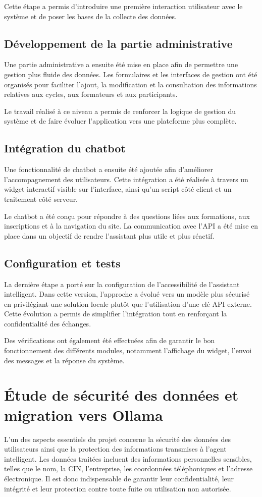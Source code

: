 \documentclass[11pt,a4paper]{report}
\begin{document}
Cette étape a permis d’introduire une première interaction utilisateur avec le système et de poser les bases de la collecte des données.

\section{Développement de la partie administrative}
Une partie administrative a ensuite été mise en place afin de permettre une gestion plus fluide des données. Les formulaires et les interfaces de gestion ont été organisés pour faciliter l’ajout, la modification et la consultation des informations relatives aux cycles, aux formateurs et aux participants.

Le travail réalisé à ce niveau a permis de renforcer la logique de gestion du système et de faire évoluer l’application vers une plateforme plus complète.

\section{Intégration du chatbot}
Une fonctionnalité de chatbot a ensuite été ajoutée afin d’améliorer l’accompagnement des utilisateurs. Cette intégration a été réalisée à travers un widget interactif visible sur l’interface, ainsi qu’un script côté client et un traitement côté serveur.

Le chatbot a été conçu pour répondre à des questions liées aux formations, aux inscriptions et à la navigation du site. La communication avec l’API a été mise en place dans un objectif de rendre l’assistant plus utile et plus réactif.

\section{Configuration et tests}
La dernière étape a porté sur la configuration de l’accessibilité de l’assistant intelligent. Dans cette version, l’approche a évolué vers un modèle plus sécurisé en privilégiant une solution locale plutôt que l’utilisation d’une clé API externe. Cette évolution a permis de simplifier l’intégration tout en renforçant la confidentialité des échanges.

Des vérifications ont également été effectuées afin de garantir le bon fonctionnement des différents modules, notamment l’affichage du widget, l’envoi des messages et la réponse du système.

\chapter{Étude de sécurité des données et migration vers Ollama}
L’un des aspects essentiels du projet concerne la sécurité des données des utilisateurs ainsi que la protection des informations transmises à l’agent intelligent. Les données traitées incluent des informations personnelles sensibles, telles que le nom, la CIN, l’entreprise, les coordonnées téléphoniques et l’adresse électronique. Il est donc indispensable de garantir leur confidentialité, leur intégrité et leur protection contre toute fuite ou utilisation non autorisée.
\end{document}
